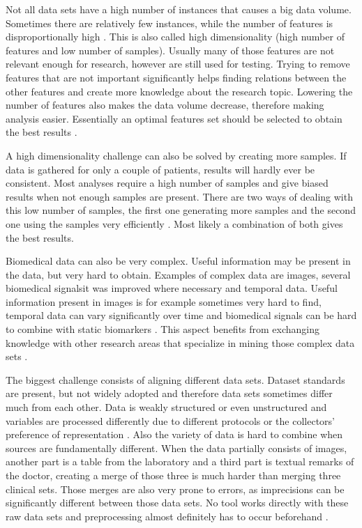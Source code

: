 \documentclass[10pt,a4paper]{report}
\begin{document}
	Not all data sets have a high number of instances that causes a big data volume. Sometimes there are relatively few instances, while the number of features is disproportionally high \cite{dubitzky2007fundamentals}. This is also called high dimensionality (high number of features and low number of samples). Usually many of those features are not relevant enough for research, however are still used for testing. Trying to remove features that are not important significantly helps finding relations between the other features and create more knowledge about the research topic. Lowering the number of features also makes the data volume decrease, therefore making analysis easier. Essentially an optimal features set should be selected to obtain the best results \cite{PENG201015}.
	
	A high dimensionality challenge can also be solved by creating more samples. If data is gathered for only a couple of patients, results will hardly ever be consistent. Most analyses require a high number of samples and give biased results when not enough samples are present. There are two ways of dealing with this low number of samples, the first one generating more samples \cite{dunbar2006spatial, devroye1986sample} and the second one using the samples very efficiently \cite{van2002gene, roff1989statistical}. Most likely a combination of both gives the best results. 
	
	Biomedical data can also be very complex. Useful information may be present in the data, but very hard to obtain. Examples of complex data are images, several biomedical signalsit was improved where necessary and temporal data. Useful information present in images is for example sometimes very hard to find, temporal data can vary significantly over time and biomedical signals can be hard to combine with static biomarkers \cite{Yoo2012}. This aspect benefits from exchanging knowledge with other research areas that specialize in mining those complex data sets \cite{Turkay2014, bellazzi2011data}.
	
	The biggest challenge consists of aligning different data sets. Dataset standards are present, but not widely adopted and therefore data sets sometimes differ much from each other. Data is weakly structured or even unstructured \cite{Holzinger2014} and variables are processed differently due to different protocols or the collectors' preference of representation \cite{Otasek2014}. Also the variety of data is hard to combine when sources are fundamentally different. When the data partially consists of images, another part is a table from the laboratory and a third part is textual remarks of the doctor, creating a merge of those three is much harder than merging three clinical sets. Those merges are also very prone to errors, as imprecisions can be significantly different between those data sets. No tool works directly with these raw data sets and preprocessing almost definitely has to occur beforehand \cite{CIOS20021, Turkay2014}.
	
\end{document}
